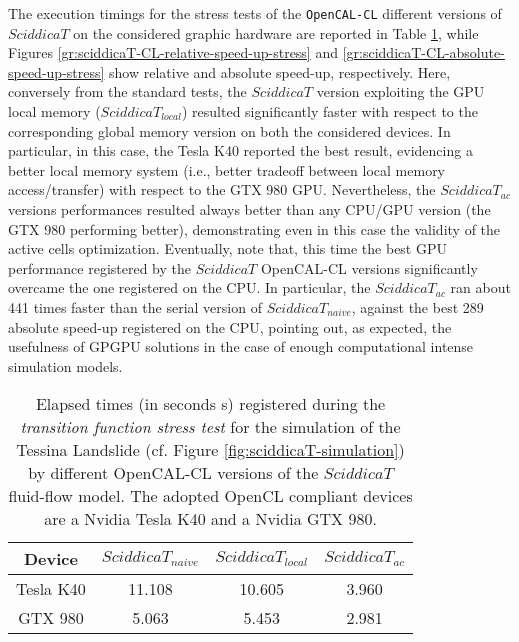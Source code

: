 The execution timings for the stress tests of the \texttt{OpenCAL-CL}
different versions of $SciddicaT$ on the considered graphic
hardware are reported in Table
\ref{tab:sciddicaT-CL-execution-times-stress}, while Figures
\ref{gr:sciddicaT-CL-relative-speed-up-stress} and
\ref{gr:sciddicaT-CL-absolute-speed-up-stress} show relative and
absolute speed-up, respectively. Here, conversely from the
standard tests, the $SciddicaT$ version exploiting the GPU local
memory ($SciddicaT_{local}$) resulted significantly faster with
respect to the corresponding global memory version on both the
considered devices. In particular, in this case, the Tesla K40
reported the best result, evidencing a better local memory system
(i.e., better tradeoff between local memory access/transfer) with
respect to the GTX 980 GPU. Nevertheless, the $SciddicaT_{ac}$
versions performances resulted always better than any CPU/GPU
version (the GTX 980 performing better), demonstrating even in
this case the validity of the active cells
optimization. Eventually, note that, this time the best GPU
performance registered by the $SciddicaT$ OpenCAL-CL versions
significantly overcame the one registered on the CPU. In
particular, the $SciddicaT_{ac}$ ran about 441 times faster than
the serial version of $SciddicaT_{naive}$, against the best 289
absolute speed-up registered on the CPU, pointing out, as
expected, the usefulness of GPGPU solutions in the case of enough
computational intense simulation models.
\begin{table}
	\centering
	\begin{tabular}{cccc}
		\hline Device & $SciddicaT_{naive}$ & $SciddicaT_{local}$ &
		$SciddicaT_{ac}$ \\ \hline Tesla K40 & 11.108 & 10.605 &
		3.960\\ GTX 980 & 5.063 & 5.453 & 2.981\\ \hline
	\end{tabular}
	\caption[Elapsed times (in seconds \si{s}) registered during the \emph{transition
		function stress test} by different OpenCAL-CL
	versions of the $SciddicaT$ fluid-flow model.]{Elapsed times (in seconds \si{s}) registered during the \emph{transition
			function stress test} for the simulation of the Tessina Landslide
		(cf. Figure \ref{fig:sciddicaT-simulation}) by different OpenCAL-CL
		versions of the $SciddicaT$ fluid-flow model. The adopted OpenCL
		compliant devices are a Nvidia Tesla K40 and a Nvidia GTX 980.}
	\label{tab:sciddicaT-CL-execution-times-stress}
\end{table}
